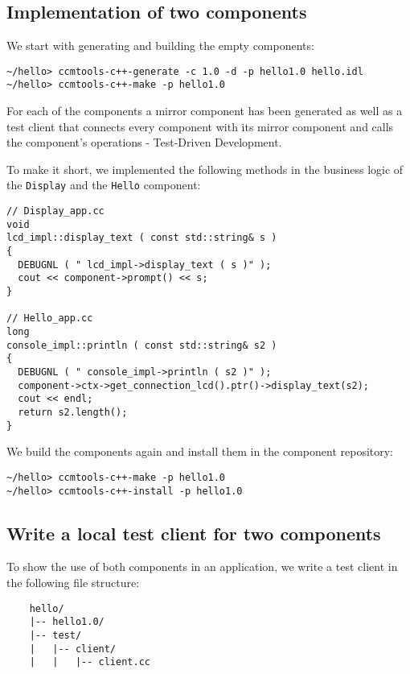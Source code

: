 \subsection{Implementation of two components}

We start with generating and building the empty components:
\begin{verbatim}
~/hello> ccmtools-c++-generate -c 1.0 -d -p hello1.0 hello.idl
~/hello> ccmtools-c++-make -p hello1.0
\end{verbatim}

\noindent
For each of the components a mirror component has been generated as well as a
test client that connects every component with its mirror component and calls
the component's operations - Test-Driven Development.

To make it short, we implemented the following methods in the business logic of
the {\tt Display} and the {\tt Hello} component:
\begin{verbatim}
// Display_app.cc
void
lcd_impl::display_text ( const std::string& s )
{
  DEBUGNL ( " lcd_impl->display_text ( s )" );
  cout << component->prompt() << s;
}

// Hello_app.cc
long
console_impl::println ( const std::string& s2 )
{
  DEBUGNL ( " console_impl->println ( s2 )" );
  component->ctx->get_connection_lcd().ptr()->display_text(s2);
  cout << endl;
  return s2.length();	
}
\end{verbatim}

\noindent
We build the components again and install them in the component repository:
\begin{verbatim}
~/hello> ccmtools-c++-make -p hello1.0
~/hello> ccmtools-c++-install -p hello1.0
\end{verbatim}


\subsection{Write a local test client for two components}
To show the use of both components in an application, we write a test client in
the following file structure:
\begin{verbatim}
    hello/
    |-- hello1.0/
    |-- test/
    |   |-- client/
    |   |   |-- client.cc 
\end{verbatim}

